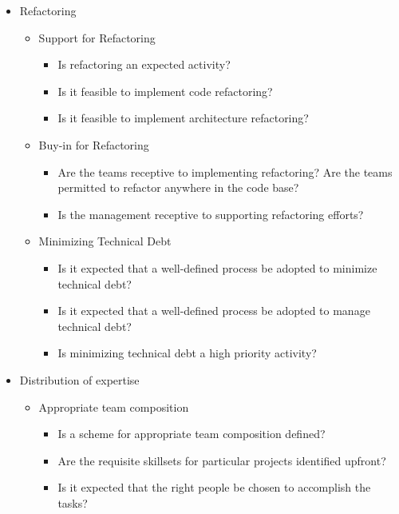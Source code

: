 \begin{appendices}
\begin{itemize}
	\item Refactoring
		\begin{itemize}
			\item Support for Refactoring 
				\begin{itemize}
					\item Is refactoring an expected activity?
					\item Is it feasible to implement code refactoring?
					\item Is it feasible to implement architecture refactoring?
				\end{itemize}
			\item Buy-in for Refactoring
				\begin{itemize}
					\item Are the teams receptive to implementing refactoring?
					\addition Are the teams permitted to refactor anywhere in the code base?
					\item Is the management receptive to supporting refactoring efforts?
				\end{itemize}
			\item Minimizing Technical Debt
				\begin{itemize}
					\item Is it expected that a well-defined process be adopted to minimize technical debt?
					\item Is it expected that a well-defined process be adopted to manage technical debt?
					\item Is minimizing technical debt a high priority activity?
				\end{itemize}
		\end{itemize}	
	\item Distribution of expertise
		\begin{itemize}
			\item Appropriate team composition
				\begin{itemize}
					\item Is a scheme for appropriate team composition defined?
					\item Are the requisite skillsets for particular projects identified upfront?
					\item Is it expected that the right people be chosen to accomplish the tasks?
				\end{itemize}
		\end{itemize}

\end{itemize}
\end{appendices}

